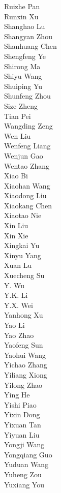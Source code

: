 \documentclass[11pt, a4paper, logo, copyright, nonumbering]{deepseek}
\begin{document}
\begin{CJK*}{UTF8}{gbsn}
\begin{multicols}{2}
Ruizhe Pan \\
Runxin Xu \\
Shanghao Lu \\
Shangyan Zhou \\
Shanhuang Chen \\
Shengfeng Ye \\
Shirong Ma \\
Shiyu Wang \\
Shuiping Yu \\
Shunfeng Zhou \\
Size Zheng \\
Tian Pei \\
Wangding Zeng \\
Wen Liu \\
Wenfeng Liang \\
Wenjun Gao \\
Wentao Zhang \\
Xiao Bi \\
Xiaohan Wang \\
Xiaodong Liu \\
Xiaokang Chen \\
Xiaotao Nie \\
Xin Liu \\
Xin Xie \\
Xingkai Yu \\
Xinyu Yang \\
Xuan Lu \\
Xuecheng Su \\
Y. Wu \\
Y.K. Li \\
Y.X. Wei \\
Yanhong Xu \\
Yao Li \\
Yao Zhao \\
Yaofeng Sun \\
Yaohui Wang \\
Yichao Zhang \\
Yiliang Xiong \\
Yilong Zhao \\
Ying He \\
Yishi Piao \\
Yixin Dong \\
Yixuan Tan \\
Yiyuan Liu \\
Yongji Wang \\
Yongqiang Guo \\
Yuduan Wang \\
Yuheng Zou \\
Yuxiang You \\

\end{multicols}
\end{CJK*}
\end{document}
